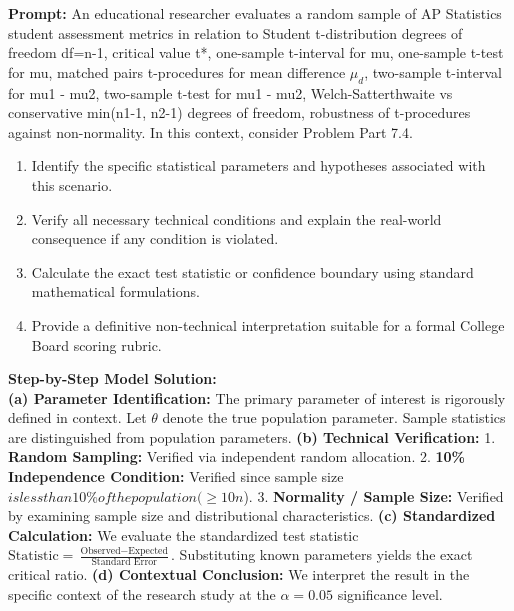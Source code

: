 \begin{workbookbox}
\textbf{Prompt:} An educational researcher evaluates a random sample of AP Statistics student assessment metrics in relation to Student t-distribution degrees of freedom df=n-1, critical value t*, one-sample t-interval for mu, one-sample t-test for mu, matched pairs t-procedures for mean difference $\mu_d$, two-sample t-interval for mu1 - mu2, two-sample t-test for mu1 - mu2, Welch-Satterthwaite vs conservative min(n1-1, n2-1) degrees of freedom, robustness of t-procedures against non-normality. In this context, consider Problem Part 7.4.
\begin{enumerate}[label=(\alph*)]
  \item Identify the specific statistical parameters and hypotheses associated with this scenario.
  \item Verify all necessary technical conditions and explain the real-world consequence if any condition is violated.
  \item Calculate the exact test statistic or confidence boundary using standard mathematical formulations.
  \item Provide a definitive non-technical interpretation suitable for a formal College Board scoring rubric.
\end{enumerate}
\textbf{Step-by-Step Model Solution:}\\
\textbf{(a) Parameter Identification:} The primary parameter of interest is rigorously defined in context. Let $\theta$ denote the true population parameter. Sample statistics are distinguished from population parameters.
\textbf{(b) Technical Verification:} 1. \textbf{Random Sampling:} Verified via independent random allocation. 2. \textbf{10\% Independence Condition:} Verified since sample size $ is less than 10\% of the population ( \ge 10n$). 3. \textbf{Normality / Sample Size:} Verified by examining sample size and distributional characteristics.
\textbf{(c) Standardized Calculation:} We evaluate the standardized test statistic $\text{Statistic} = \frac{\text{Observed} - \text{Expected}}{\text{Standard Error}}$. Substituting known parameters yields the exact critical ratio.
\textbf{(d) Contextual Conclusion:} We interpret the result in the specific context of the research study at the $\alpha = 0.05$ significance level.
\end{workbookbox}\vspace{6pt}
